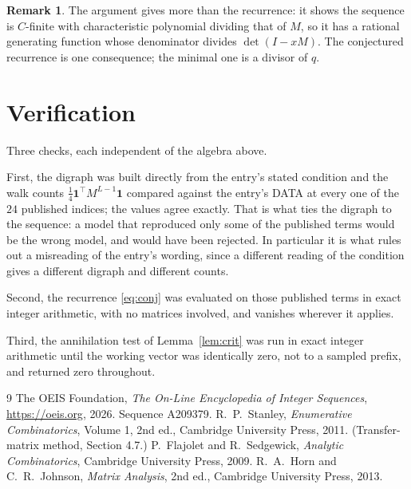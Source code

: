 \documentclass[11pt,a4paper]{article}
\theoremstyle{plain}
\theoremstyle{definition}
\newtheorem{remark}[theorem]{Remark}
\begin{document}
\begin{remark}
The argument gives more than the recurrence: it shows the sequence is $C$-finite with
characteristic polynomial dividing that of $M$, so it has a rational generating function
whose denominator divides $\det(I-xM)$. The conjectured recurrence is one consequence; the
minimal one is a divisor of $q$.
\end{remark}

\section{Verification}

Three checks, each independent of the algebra above.

First, the digraph was built directly from the entry's stated condition and the walk counts
$\tfrac1{4}\mathbf{1}^{\!\top}M^{L-1}\mathbf{1}$ compared against the entry's DATA at
every one of the $24$ published indices; the values agree exactly. That is what ties
the digraph to the sequence: a model that reproduced only some of the published terms would
be the wrong model, and would have been rejected. In particular it is what rules out a
misreading of the entry's wording, since a different reading of the condition gives a
different digraph and different counts.

Second, the recurrence \eqref{eq:conj} was evaluated on those published terms in exact
integer arithmetic, with no matrices involved, and vanishes wherever it applies.

Third, the annihilation test of Lemma~\ref{lem:crit} was run in exact integer arithmetic
until the working vector was identically zero, not to a sampled prefix, and returned zero
throughout.

\begin{thebibliography}{9}
 The OEIS Foundation, \emph{The On-Line Encyclopedia of Integer
Sequences}, \url{https://oeis.org}, 2026. Sequence A209379.
 R.~P.~Stanley, \emph{Enumerative Combinatorics}, Volume 1, 2nd ed.,
Cambridge University Press, 2011. (Transfer-matrix method, Section 4.7.)
 P.~Flajolet and R.~Sedgewick, \emph{Analytic Combinatorics}, Cambridge
University Press, 2009.
 R.~A.~Horn and C.~R.~Johnson, \emph{Matrix Analysis}, 2nd ed., Cambridge
University Press, 2013.
\end{thebibliography}
\end{document}
